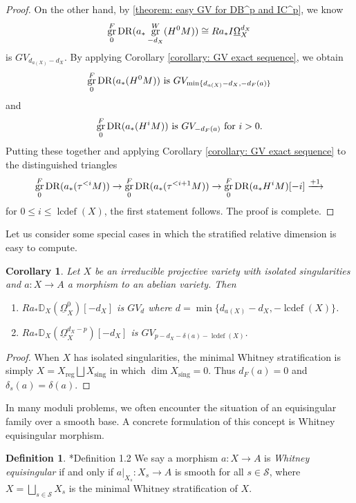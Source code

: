 \documentclass[11pt]{amsart}
\newtheorem{corollary}[equation]{Corollary}
\theoremstyle{definition}
\newtheorem{definition}[equation]{Definition}
\theoremstyle{plain}
\newcommand{\DD}{\mathbb D}
\newcommand{\sS}{\mathscr S}
\newcommand{\xto}{\xrightarrow} %
\newcommand{\DB}{\underline{\Omega}} %
\DeclareMathOperator{\DR}{DR}
\DeclareMathOperator{\sing}{sing}
\DeclareMathOperator{\reg}{reg}
\DeclareMathOperator{\gr}{{\rm gr}}
\DeclareMathOperator{\lcdef}{lcdef}
\begin{document}
\begin{proof}
    On the other hand, by \ref{theorem: easy GV for DB^p and IC^p}, we know
    \[\gr^F_{0} \DR(a_* \gr^W_{-d_X} (H^0M)) \cong Ra_* I\DB_X^{d_X}\]
    is $GV_{d_{a(X)}-d_X}$. By applying Corollary \ref{corollary: GV exact sequence}, we obtain
    \[\gr^F_0 \DR(a_*(H^0M)) \text{ is } GV_{\min\{d_{a(X)}-d_X, -d_F(a)\}}\]
    and 
    \[\gr^F_0 \DR(a_*(H^iM)) \text{ is } GV_{-d_F(a)} \text{ for } i>0.\]
    Putting these together and applying Corollary \ref{corollary: GV exact sequence} to the distinguished triangles
    \[\gr^F_{0} \DR( a_*(\tau^{< i}M)) \to \gr^F_{0} \DR(a_*(\tau^{<i+1}M)) \to \gr^F_{0} \DR(a_* H^{i}M)[-i] \xto{+1}\]
    for $0\le i \le \lcdef(X)$, the first statement follows. The proof is complete.  
\end{proof}

Let us consider some special cases in which the stratified relative dimension is easy to compute.

\begin{corollary} 
    Let $X$ be an irreducible projective variety with isolated singularities and $a: X \to A$ a morphism to an abelian variety. Then 
    \begin{enumerate}
        \item $R a_* \DD_X(\DB^0_X)[-d_X]$ is $GV_{d}$ where $d=\min\{d_{a(X)}-d_X, -\lcdef(X)\}$. 
        \item $R a_* \DD_X(\DB^{d_X-p}_X)[-d_X]$ is $GV_{p-d_X-\delta(a)-\lcdef(X)}$.
    \end{enumerate}
\end{corollary}

\begin{proof}
    When $X$ has isolated singularities, the minimal Whitney stratification is simply $X = X_{\reg} \bigsqcup X_{\sing}$ in which $\dim X_{\sing} = 0$. Thus $d_F(a) = 0$ and $\delta_s(a) = \delta(a)$. 
\end{proof}

In many moduli problems, we often encounter the situation of an equisingular family over a smooth base. A concrete formulation of this concept is Whitney equisingular morphism. 

\begin{definition} \cite{Sunggi-Viehweg-hyperbolicity}*{Definition 1.2}
    We say a morphism $a:X \to A$ is \textit{Whitney equisingular} if and only if $a|_{X_s}: X_s \to A$ is smooth for all $s\in \sS$, where $X= \bigsqcup_{s\in \sS} X_s$ is the minimal Whitney stratification of $X$. 
\end{definition}
\end{document}
